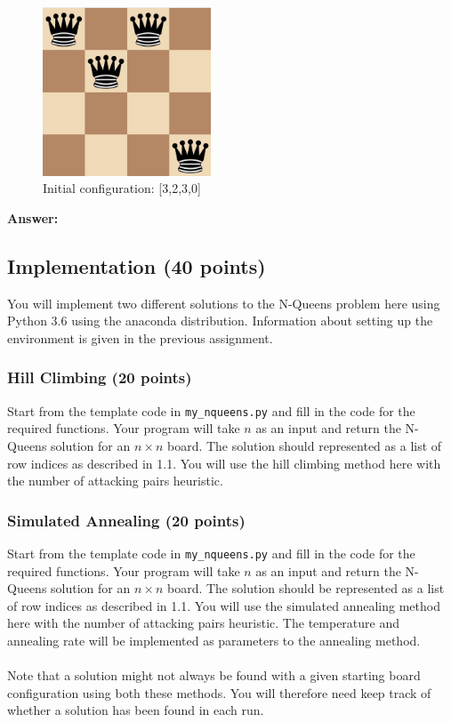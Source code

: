 \documentclass{article}
\begin{document}
\begin{figure}[h]
\centering
\includegraphics[width=5cm]{chess_board.png}
%
%
\caption{Initial configuration: [3,2,3,0]}
\end{figure}

\noindent \textbf{Answer:}

\subsection{Implementation (40 points) }
You will implement two different solutions to the N-Queens problem here using Python 3.6 using the anaconda distribution. Information about setting up the environment is given in the previous assignment. 

\subsubsection{Hill Climbing (20 points)}
Start from the template code in \texttt{my\_nqueens.py} and fill in the code for the required functions. Your program will take $n$ as an input and return the N-Queens solution for an $n\times n$ board. The solution should represented as a list of row indices as described in 1.1. You will use the hill climbing method here with the number of attacking pairs heuristic.

\subsubsection{Simulated Annealing (20 points)}
Start from the template code in \texttt{my\_nqueens.py} and fill in the code for the required functions. Your program will take $n$ as an input and return the N-Queens solution for an $n\times n$ board. The solution should be represented as a list of row indices as described in 1.1. You will use the simulated annealing method here with the number of attacking pairs heuristic. The temperature and annealing rate will be implemented as parameters to the annealing method.
\\ \\ 
Note that a solution might not always be found with a given starting board configuration using both these methods. You will therefore need keep track of whether a solution has been found in each run. 
\end{document}
